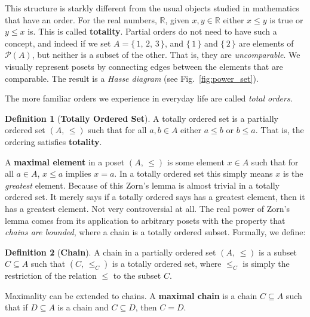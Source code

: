 \documentclass{article}
\theoremstyle{definition}
\newtheorem{definition}{Definition}[section]
\begin{document}
            This structure is starkly different from the usual objects studied
            in mathematics that have an order. For the real numbers,
            $\mathbb{R}$, given $x,y\in\mathbb{R}$ either $x\leq{y}$ is true
            or $y\leq{x}$ is. This is called \textbf{totality}. Partial orders
            do not need to have such a concept, and indeed if we set
            $A=\{\,1,\,2,\,3\,\}$, and $\{\,1\,\}$ and $\{\,2\,\}$ are elements
            of $\mathcal{P}(A)$, but neither is a subset of the other. That is,
            they are \textit{uncomparable}. We visually represent posets by
            connecting edges between the elements that are comparable. The
            result is a \textit{Hasse diagram} (see Fig.~\ref{fig:power_set}).
            \par\hfill\par
            The more familiar orders we experience in everyday life are
            called \textit{total orders}.
            \begin{definition}[\textbf{Totally Ordered Set}]
                A totally ordered set is a partially ordered set
                $(A,\,\leq)$ such that for all $a,b\in{A}$ either
                $a\leq{b}$ or $b\leq{a}$. That is, the ordering satisfies
                \textbf{totality}.
            \end{definition}
            A \textbf{maximal element} in a poset $(A,\,\leq)$ is some element
            $x\in{A}$ such that for all $a\in{A}$, $x\leq{a}$ implies $x=a$.
            In a totally ordered set this simply means $x$ is the
            \textit{greatest} element. Because of this
            Zorn's lemma is almost trivial in a totally ordered set. It merely
            says if a totally ordered says has a greatest element, then it has
            a greatest element. Not very controversial at all. The real power
            of Zorn's lemma comes from its application to arbitrary posets
            with the property that \textit{chains are bounded}, where a chain
            is a totally ordered subset. Formally, we define:
            \begin{definition}[\textbf{Chain}]
                A chain in a partially ordered set $(A,\,\leq)$ is a subset
                $C\subseteq{A}$ such that $(C,\,\leq_{C})$ is a totally ordered
                set, where $\leq_{C}$ is simply the restriction of the relation
                $\leq$ to the subset $C$.
            \end{definition}
            Maximality can be extended to chains. A
            \textbf{maximal chain} is a chain $C\subseteq{A}$ such that if
            $D\subseteq{A}$ is a chain and $C\subseteq{D}$, then $C=D$.
\end{document}
